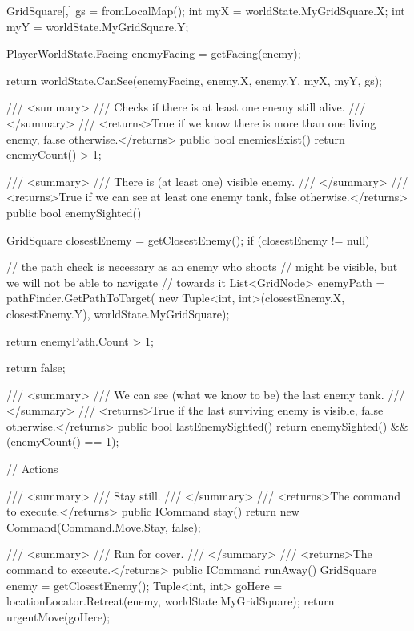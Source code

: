 \documentclass[11pt]{article}
\begin{document}
\begin{code}
{{{            GridSquare[,] gs = fromLocalMap();
            int myX = worldState.MyGridSquare.X;
            int myY = worldState.MyGridSquare.Y;
            
            PlayerWorldState.Facing enemyFacing = getFacing(enemy);

            return worldState.CanSee(enemyFacing, enemy.X, enemy.Y, myX, myY, gs);
        }

        /// <summary>
        /// Checks if there is at least one enemy still alive.
        /// </summary>
        /// <returns>True if we know there is more than one living enemy, false otherwise.</returns>
        public bool enemiesExist()
        {
            return enemyCount() > 1;
        }

        /// <summary>
        /// There is (at least one) visible enemy.
        /// </summary>
        /// <returns>True if we can see at least one enemy tank, false otherwise.</returns>
        public bool enemySighted()
        {
            GridSquare closestEnemy = getClosestEnemy();
            if (closestEnemy != null) {
                // the path check is necessary as an enemy who shoots
                // might be visible, but we will not be able to navigate
                // towards it
                List<GridNode> enemyPath = pathFinder.GetPathToTarget(
                    new Tuple<int, int>(closestEnemy.X, closestEnemy.Y), worldState.MyGridSquare);

                return enemyPath.Count > 1;
            }

            return false;
        }

        /// <summary>
        /// We can see (what we know to be) the last enemy tank.
        /// </summary>
        /// <returns>True if the last surviving enemy is visible, false otherwise.</returns>
        public bool lastEnemySighted()
        {
            return enemySighted() && (enemyCount() == 1);
        }

        // Actions

        /// <summary>
        /// Stay still.
        /// </summary>
        /// <returns>The command to execute.</returns>
        public ICommand stay()
        {
            return new Command(Command.Move.Stay, false);
        }

        /// <summary>
        /// Run for cover.
        /// </summary>
        /// <returns>The command to execute.</returns>
        public ICommand runAway()
        {
            GridSquare enemy = getClosestEnemy();
            Tuple<int, int> goHere = locationLocator.Retreat(enemy, worldState.MyGridSquare);
            return urgentMove(goHere);
        }

}}
\end{code}
\end{document}
